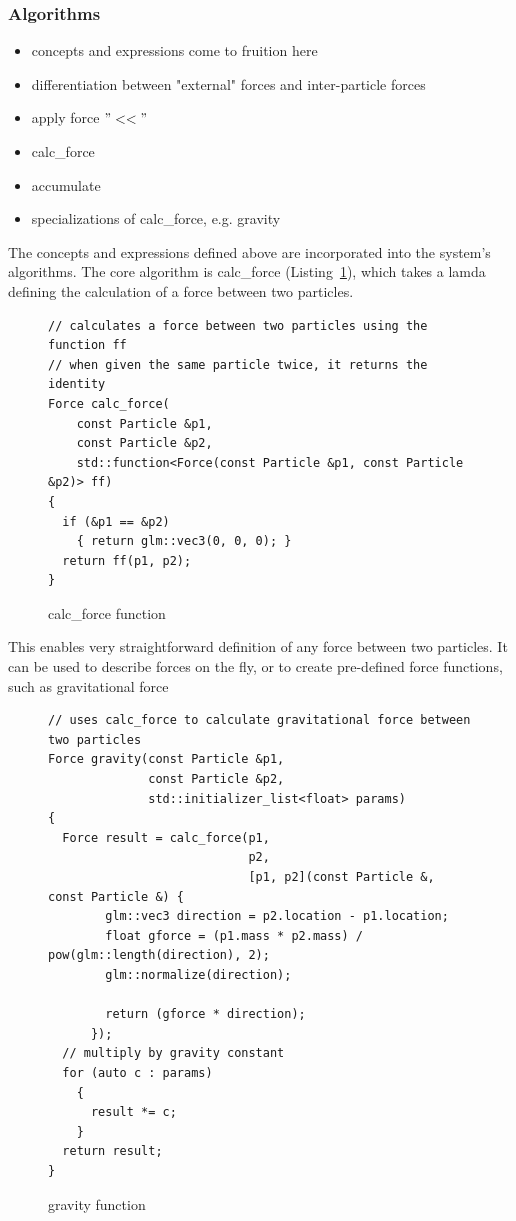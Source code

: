 \documentclass[runningheads,a4paper]{llncs}
\begin{document}
\subsubsection{Algorithms}
\begin{itemize}
\item concepts and expressions come to fruition here
\item differentiation between "external" forces and inter-particle forces
\item apply force $"<<"$
\item calc\_force
\item accumulate
\item specializations of calc\_force, e.g. gravity
\end{itemize}

The concepts and expressions defined above are incorporated into the system's algorithms. The core algorithm is calc\_force (Listing~\ref{fig:calcforce}), which takes a lamda defining the calculation of a force between two particles. 

\begin{figure}[tb]
\begin{lstlisting}
// calculates a force between two particles using the function ff
// when given the same particle twice, it returns the identity
Force calc_force(
    const Particle &p1,
    const Particle &p2,
    std::function<Force(const Particle &p1, const Particle &p2)> ff)
{
  if (&p1 == &p2)
    { return glm::vec3(0, 0, 0); }
  return ff(p1, p2);
}                                    
\end{lstlisting}
 \caption{calc\_force function}
 \label{fig:calcforce}
\end{figure}

This enables very straightforward definition of any force between two particles. It can be used to describe forces on the fly, or to create pre-defined force functions, such as gravitational force

\begin{figure}[tb]
\begin{lstlisting}
// uses calc_force to calculate gravitational force between two particles
Force gravity(const Particle &p1,
			  const Particle &p2,
              std::initializer_list<float> params)
{
  Force result = calc_force(p1,
  							p2, 
  						    [p1, p2](const Particle &, const Particle &) {
        glm::vec3 direction = p2.location - p1.location;
        float gforce = (p1.mass * p2.mass) / pow(glm::length(direction), 2);
        glm::normalize(direction);

        return (gforce * direction);
      });
  // multiply by gravity constant
  for (auto c : params)
    {
      result *= c;
    }
  return result;
}               
\end{lstlisting}
 \caption{gravity function}
 \label{fig:gravity}
\end{figure}
\end{document}
